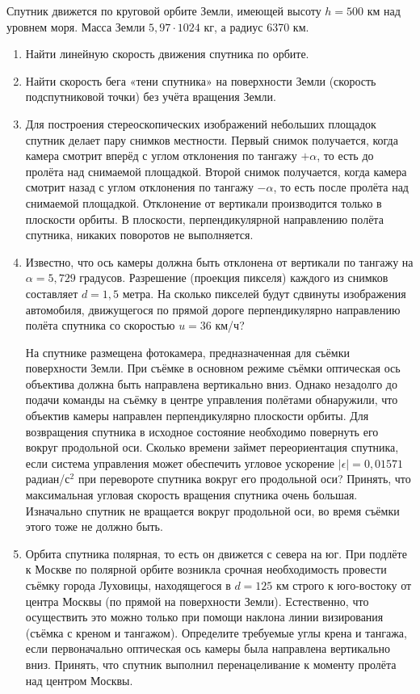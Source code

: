 
Спутник движется по круговой орбите Земли, имеющей высоту $h=500$ км над уровнем моря. Масса Земли $5,97 \cdot 1024$ кг,
а радиус 6370 км.

\begin{enumerate}
    \item Найти линейную скорость движения спутника по орбите.
    \item Найти скорость бега «тени спутника» на поверхности Земли (скорость подспутниковой точки) без учёта 
    вращения Земли.
    \item Для построения стереоскопических изображений небольших площадок спутник делает пару снимков местности. 
    Первый снимок получается, когда камера смотрит вперёд с углом отклонения по тангажу $+\alpha$, то есть до пролёта 
    над снимаемой площадкой. Второй снимок получается, когда камера смотрит назад с углом отклонения по тангажу 
    $-\alpha$, то есть  после пролёта над снимаемой площадкой. Отклонение от вертикали производится только в 
    плоскости орбиты. В плоскости, перпендикулярной направлению полёта спутника, никаких поворотов не выполняется.
    \item Известно, что ось камеры должна быть отклонена от вертикали по тангажу на $\alpha=5,729$ градусов. 
    Разрешение (проекция пикселя) каждого из снимков составляет $d=1,5$ метра. На сколько пикселей будут сдвинуты 
    изображения автомобиля, движущегося по прямой дороге перпендикулярно направлению полёта спутника со скоростью 
    $u=36$ км/ч?

    На спутнике размещена фотокамера, предназначенная для съёмки поверхности Земли. При съёмке в основном режиме 
    съёмки оптическая ось объектива должна быть направлена вертикально вниз. Однако незадолго до подачи команды 
    на съёмку в центре управления полётами обнаружили, что объектив камеры направлен перпендикулярно плоскости 
    орбиты. Для возвращения спутника в исходное состояние необходимо повернуть его вокруг продольной оси. 
    Сколько времени займет переориентация спутника, если система управления может обеспечить угловое ускорение 
    $|\epsilon|=0,01571$ радиан/с$^2$ при перевороте спутника вокруг его продольной оси? Принять, что максимальная 
    угловая скорость вращения спутника очень большая. Изначально спутник не вращается вокруг продольной оси, 
    во время съёмки этого тоже не должно быть.
    \item Орбита спутника полярная, то есть он движется с севера на юг. При подлёте к Москве по полярной 
    орбите возникла срочная необходимость провести съёмку города Луховицы, находящегося в $d=125$ км строго к 
    юго-востоку от центра Москвы (по прямой на поверхности Земли). Естественно, что осуществить это можно только 
    при помощи наклона линии визирования (съёмка с креном и тангажом). Определите требуемые углы крена и тангажа, 
    если первоначально оптическая ось камеры была направлена вертикально вниз. Принять, что спутник выполнил 
    перенацеливание к моменту пролёта над центром Москвы.


\end{enumerate}
